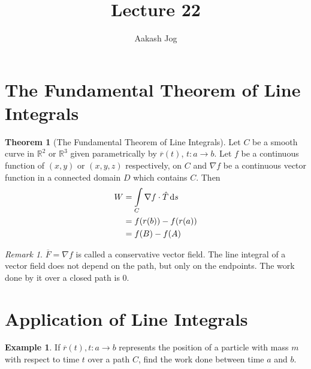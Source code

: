 \documentclass[fleqn, a4paper, 12pt]{article}
\title{Lecture 22}
\author{Aakash Jog}
\date{\formatdate{13}{1}{2015}}
\theoremstyle{definition}
\newtheorem{example}{Example}
\theoremstyle{theorem}
\newtheorem{theorem}{Theorem}
\theoremstyle{remark}
\newtheorem{remark}{Remark}
\begin{document}
	
\maketitle

\tableofcontents

\newpage

\section{The Fundamental Theorem of Line Integrals}

\begin{theorem}[The Fundamental Theorem of Line Integrals]\label{The Fundamental Theorem of Line Integrals}
	Let $C$ be a smooth curve in $\mathbb{R}^2$ or $\mathbb{R}^3$ given parametrically by $\overline{r}(t)$, $t : a \to b$. Let $f$ be a continuous function of $(x,y)$ or $(x,y,z)$ respectively, on $C$ and $\nabla f$ be a continuous vector function in a connected domain $D$ which contains $C$. Then
	\begin{align*}
		W &= \int\limits_{C} \nabla f \cdot \hat{T} \dif s\\
		&= f(r(b)) - f(r(a))\\
		&= f(B) - f(A)
	\end{align*}
\end{theorem}

\begin{remark}
	$\overline{F} = \nabla f$ is called a conservative vector field. The line integral of a vector field does not depend on the path, but only on the endpoints. The work done by it over a closed path is 0.
\end{remark}

\section{Application of Line Integrals}

\begin{example}
	If $\overline{r}(t), t : a \to b$ represents the position of a particle with mass $m$ with respect to time $t$ over a path $C$, find the work done between time $a$ and $b$.
\end{example}
\end{document}
